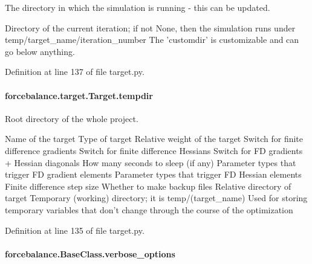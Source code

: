 The directory in which the simulation is running -\/ this can be updated. 

Directory of the current iteration; if not None, then the simulation runs under temp/target\-\_\-name/iteration\-\_\-number The 'customdir' is customizable and can go below anything.

Definition at line 137 of file target.\-py.

\hypertarget{classforcebalance_1_1target_1_1Target_aa1f01b5b78db253b5b66384ed11ed193}{
\paragraph[{tempdir}]{\setlength{\rightskip}{0pt plus 5cm}forcebalance.\-target.\-Target.\-tempdir\hspace{0.3cm}{\ttfamily [inherited]}}}\label{classforcebalance_1_1target_1_1Target_aa1f01b5b78db253b5b66384ed11ed193}


Root directory of the whole project. 

Name of the target Type of target Relative weight of the target Switch for finite difference gradients Switch for finite difference Hessians Switch for F\-D gradients + Hessian diagonals How many seconds to sleep (if any) Parameter types that trigger F\-D gradient elements Parameter types that trigger F\-D Hessian elements Finite difference step size Whether to make backup files Relative directory of target Temporary (working) directory; it is temp/(target\-\_\-name) Used for storing temporary variables that don't change through the course of the optimization 

Definition at line 135 of file target.\-py.

\hypertarget{classforcebalance_1_1BaseClass_afd68efa29ccd2f320f4cf82198214aac}{
\paragraph[{verbose\-\_\-options}]{\setlength{\rightskip}{0pt plus 5cm}forcebalance.\-Base\-Class.\-verbose\-\_\-options\hspace{0.3cm}{\ttfamily [inherited]}}}\label{classforcebalance_1_1BaseClass_afd68efa29ccd2f320f4cf82198214aac}


